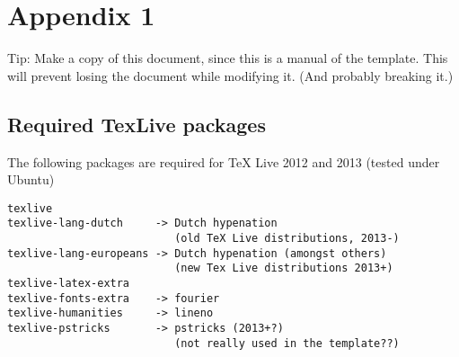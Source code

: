\chapter{Appendix 1} \label{app:one}
Tip: Make a copy of this document, since this is a manual of the template. This
will prevent losing the document while modifying it. (And probably breaking
it.)

\section{Required TexLive packages} 
The following packages are required for TeX Live 2012 and 2013 (tested under Ubuntu) 
\begin{verbatim} 
texlive
texlive-lang-dutch     -> Dutch hypenation
                          (old TeX Live distributions, 2013-)
texlive-lang-europeans -> Dutch hypenation (amongst others)
                          (new Tex Live distributions 2013+)
texlive-latex-extra
texlive-fonts-extra    -> fourier
texlive-humanities     -> lineno
texlive-pstricks       -> pstricks (2013+?)
                          (not really used in the template??)
\end{verbatim}
